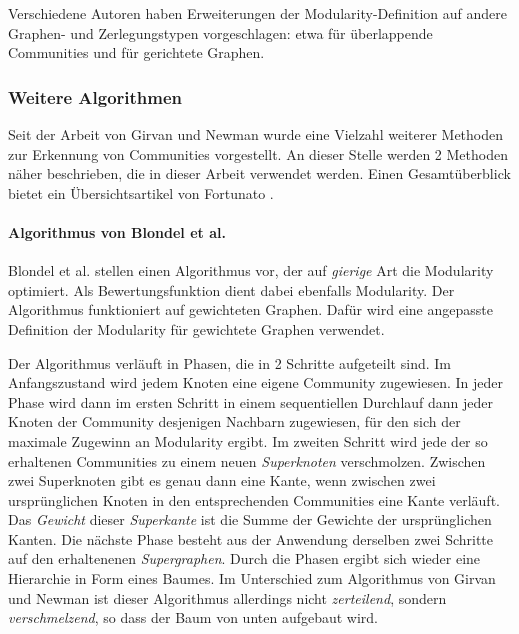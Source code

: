 Verschiedene Autoren haben Erweiterungen der Modularity-Definition auf
andere Graphen- und Zerlegungstypen vorgeschlagen: etwa f\"ur
\"uberlappende Communities\cite{Nicosia2009} und f\"ur gerichtete
Graphen\cite{Leicht2008}.

\subsubsection{Weitere Algorithmen}
\label{sec:algorithmen}

Seit der Arbeit von Girvan und Newman wurde eine Vielzahl weiterer
Methoden zur Erkennung von Communities vorgestellt. An dieser Stelle
werden 2 Methoden n\"aher beschrieben, die in dieser Arbeit verwendet
werden. Einen Gesamt\"uberblick bietet ein \"Ubersichtsartikel von
Fortunato \cite{Fortunato2010}.

\paragraph{Algorithmus von Blondel et al.}
\label{sec:algor-von-blond}

Blondel et al.\cite{Blondel2008} stellen einen Algorithmus vor, der
auf \emph{gierige} Art die Modularity optimiert.  Als
Bewertungsfunktion dient dabei ebenfalls Modularity. Der Algorithmus
funktioniert auf gewichteten Graphen. Daf\"ur wird eine angepasste
Definition der Modularity f\"ur gewichtete Graphen
verwendet\cite{Newman2004a}.

Der Algorithmus verl\"auft in Phasen, die in 2 Schritte aufgeteilt
sind. Im Anfangszustand wird jedem Knoten eine eigene Community
zugewiesen. In jeder Phase wird dann im ersten Schritt in einem
sequentiellen Durchlauf dann jeder Knoten der Community desjenigen
Nachbarn zugewiesen, f\"ur den sich der maximale Zugewinn an
Modularity ergibt. Im zweiten Schritt wird jede der so erhaltenen
Communities zu einem neuen \emph{Superknoten} verschmolzen. Zwischen
zwei Superknoten gibt es genau dann eine Kante, wenn zwischen zwei
urspr\"unglichen Knoten in den entsprechenden Communities eine Kante
verl\"auft. Das \emph{Gewicht} dieser \emph{Superkante} ist die Summe
der Gewichte der urspr\"unglichen Kanten. Die n\"achste Phase besteht
aus der Anwendung derselben zwei Schritte auf den erhaltenenen
\emph{Supergraphen}. Durch die Phasen ergibt sich wieder eine
Hierarchie in Form eines Baumes. Im Unterschied zum Algorithmus von
Girvan und Newman ist dieser Algorithmus allerdings nicht
\emph{zerteilend}, sondern \emph{verschmelzend}, so dass der Baum von
unten aufgebaut wird.

